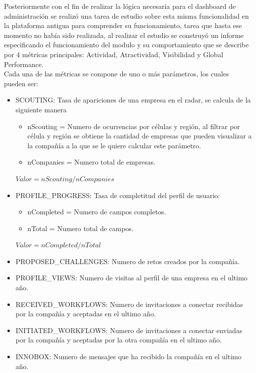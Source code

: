 Posteriormente con el fin de realizar la lógica necesaria para el dashboard de administración se realizó una tarea de estudio sobre esta misma funcionalidad en la plataforma antigua para comprender su funcionamiento, tarea que hasta ese momento no había sido realizada, al realizar el estudio se construyó un informe especificando el funcionamiento del modulo y su comportamiento que se describe por 4 métricas principales: Actividad, Atractividad, Visibilidad y Global Performance.\\

Cada una de las métricas se compone de uno o más parámetros, los cuales pueden ser:

\begin{itemize}
	\item SCOUTING: Tasa de apariciones de una empresa en el radar, se calcula de la siguiente manera
	\begin{itemize}
		\item nScouting = Numero de ocurrencias por células y región, al filtrar por célula y región se obtiene la cantidad de empresas  que pueden visualizar a la compañía a la que se le quiere calcular este parámetro.
		\item nCompanies = Numero total de empresas.
	\end{itemize}
	$Valor = nScouting/nCompanies$
	
	\item PROFILE\_PROGRESS: Tasa de completitud del perfil de usuario:
	
	\begin{itemize}
		\item nCompleted = Numero de campos completos.
		\item nTotal = Numero total de campos.
	\end{itemize}
	
	$Valor = nCompleted/nTotal$
	
	\item PROPOSED\_CHALLENGES: Numero de retos creados por la compañía.
	
	\item PROFILE\_VIEWS: Numero de visitas al perfil de una empresa en el ultimo año.
	
	\item RECEIVED\_WORKFLOWS: Numero de invitaciones a conectar recibidas por la compañía y aceptadas en el ultimo año.
	
	\item INITIATED\_WORKFLOWS: Numero de invitaciones a conectar enviadas por la compañía y aceptadas por la otra compañía en el ultimo año.
	
	\item INNOBOX: Numero de mensajes que ha recibido la compañía en el ultimo año.
	
\end{itemize}

